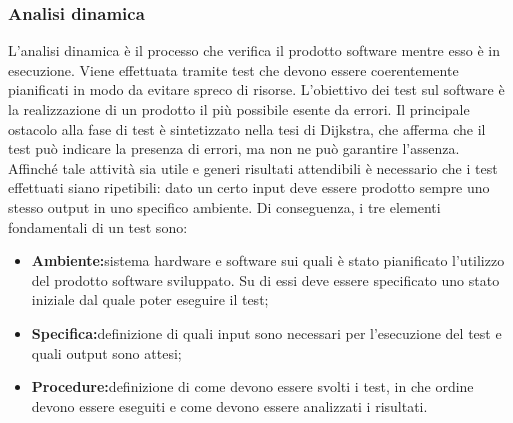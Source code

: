 \subsubsection{Analisi dinamica}
    L'analisi dinamica è il processo che verifica il prodotto software mentre esso è in esecuzione. Viene effettuata tramite test che devono essere coerentemente pianificati in modo da evitare spreco di risorse.
    L'obiettivo dei test sul software è la realizzazione di un prodotto il più possibile esente da errori. Il principale ostacolo alla fase di test è sintetizzato nella tesi di Dijkstra, che afferma che il test può indicare la presenza di errori, ma non ne può garantire l'assenza.
Affinché tale attività sia utile e generi risultati attendibili è necessario che i test effettuati
siano ripetibili: dato un certo input deve essere prodotto sempre uno stesso output in
uno specifico ambiente. Di conseguenza, i tre elementi fondamentali di un test sono:    
    \begin{itemize}
    \item \textbf{Ambiente:}sistema hardware e software sui quali è stato pianificato l'utilizzo del
prodotto software sviluppato. Su di essi deve essere specificato uno stato iniziale
dal quale poter eseguire il test;
    \item \textbf{Specifica:}definizione di quali input sono necessari per l'esecuzione del test e quali output sono attesi;
    \item \textbf{Procedure:}definizione di come devono essere svolti i test, in che ordine devono
essere eseguiti e come devono essere analizzati i risultati.
    \end{itemize}
    
